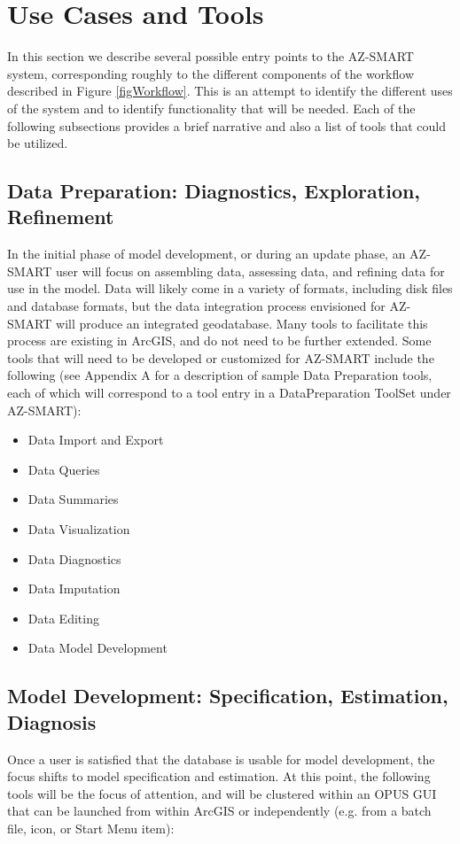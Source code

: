 \section{Use Cases and Tools}
In this section we describe several possible entry points to the AZ-SMART system, corresponding roughly to the different components of the workflow described in Figure \ref{figWorkflow}.
This is an attempt to identify the different uses of the system and to identify
functionality that will be needed.  Each of the following subsections
provides a brief narrative and also a list of tools that could be utilized.

\subsection{Data Preparation: Diagnostics, Exploration, Refinement}

In the initial phase of model development, or during an update phase, an AZ-SMART user will 
focus on assembling data, assessing data, and refining data for use in the model.  Data will
likely come in a variety of formats, including disk files and database formats,
but the data integration process envisioned for AZ-SMART will produce an integrated geodatabase.
Many tools to facilitate this process are existing in ArcGIS, and do not need to be further extended.  Some tools that will need to be developed or customized for AZ-SMART include the following 
(see Appendix A for a description of sample Data Preparation tools, each of which will correspond to a tool entry in a DataPreparation ToolSet under AZ-SMART):

\begin{itemize}
    \item Data Import and Export
    \item Data Queries
    \item Data Summaries
    \item Data Visualization
    \item Data Diagnostics
    \item Data Imputation
    \item Data Editing
    \item Data Model Development
\end{itemize}

\subsection{Model Development: Specification, Estimation, Diagnosis}
Once a user is satisfied that the database is usable for model development, the focus shifts to model specification and estimation.  At this point, the following tools will be the focus of attention, and will be clustered within an OPUS GUI that can be launched from within ArcGIS or independently (e.g. from a batch file, icon, or Start Menu item):

